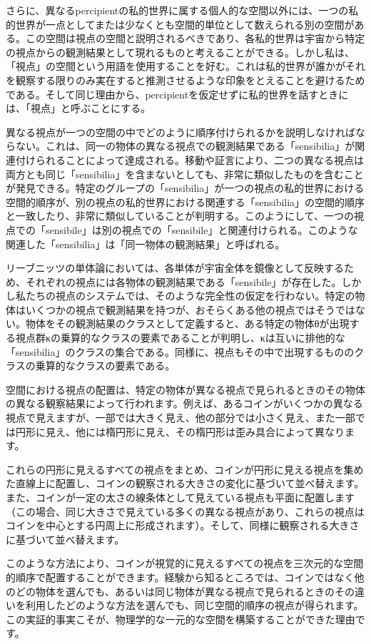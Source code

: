 \documentclass[a4paper,11pt,openany]{ltjsbook}
\begin{document}
さらに、異なるpercipientの私的世界に属する個人的な空間以外には、一つの私的世界が一点としてまたは少なくとも空間的単位として数えられる別の空間がある。この空間は視点の空間と説明されるべきであり、各私的世界は宇宙から特定の視点からの観測結果として現れるものと考えることができる。しかし私は、「視点」の空間という用語を使用することを好む。これは私的世界が誰かがそれを観察する限りのみ実在すると推測させるような印象をとえることを避けるためである。そして同じ理由から、percipientを仮定せずに私的世界を話すときには、「視点」と呼ぶことにする。

異なる視点が一つの空間の中でどのように順序付けられるかを説明しなければならない。これは、同一の物体の異なる視点での観測結果である「sensibilia」が関連付けられることによって達成される。移動や証言により、二つの異なる視点は両方とも同じ「sensibilia」を含まないとしても、非常に類似したものを含むことが発見できる。特定のグループの「sensibilia」が一つの視点の私的世界における空間的順序が、別の視点の私的世界における関連する「sensibilia」の空間的順序と一致したり、非常に類似していることが判明する。このようにして、一つの視点での「sensibile」は別の視点での「sensibile」と関連付けられる。このような関連した「sensibilia」は「同一物体の観測結果」と呼ばれる。

リーブニッツの単体論においては、各単体が宇宙全体を鏡像として反映するため、それぞれの視点には各物体の観測結果である「sensibile」が存在した。しかし私たちの視点のシステムでは、そのような完全性の仮定を行わない。特定の物体はいくつかの視点で観測結果を持つが、おそらくある他の視点ではそうではない。物体をその観測結果のクラスとして定義すると、ある特定の物体θが出現する視点群κの乗算的なクラスの要素であることが判明し、κは互いに排他的な「sensibilia」のクラスの集合である。同様に、視点もその中で出現するもののクラスの乗算的なクラスの要素である。

空間における視点の配置は、特定の物体が異なる視点で見られるときのその物体の異なる観察結果によって行われます。例えば、あるコインがいくつかの異なる視点で見えますが、一部では大きく見え、他の部分では小さく見え、また一部では円形に見え、他には楕円形に見え、その楕円形は歪み具合によって異なります。

これらの円形に見えるすべての視点をまとめ、コインが円形に見える視点を集めた直線上に配置し、コインの観察される大きさの変化に基づいて並べ替えます。また、コインが一定の太さの線条体として見えている視点も平面に配置します（この場合、同じ大きさで見えている多くの異なる視点があり、これらの視点はコインを中心とする円周上に形成されます）。そして、同様に観察される大きさに基づいて並べ替えます。

このような方法により、コインが視覚的に見えるすべての視点を三次元的な空間的順序で配置することができます。経験から知るところでは、コインではなく他のどの物体を選んでも、あるいは同じ物体が異なる視点で見られるときのその違いを利用したどのような方法を選んでも、同じ空間的順序の視点が得られます。この実証的事実こそが、物理学的な一元的な空間を構築することができた理由です。
\end{document}
